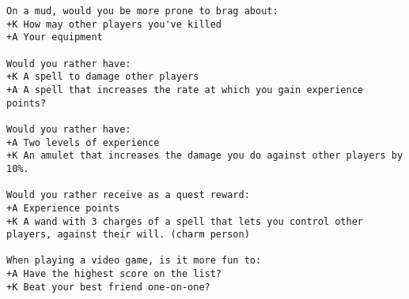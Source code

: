 \begin{verbatim}
On a mud, would you be more prone to brag about:
+K How may other players you've killed
+A Your equipment

Would you rather have:
+K A spell to damage other players
+A A spell that increases the rate at which you gain experience points?

Would you rather have:
+A Two levels of experience
+K An amulet that increases the damage you do against other players by 10%.

Would you rather receive as a quest reward:
+A Experience points
+K A wand with 3 charges of a spell that lets you control other players, against their will. (charm person)

When playing a video game, is it more fun to:
+A Have the highest score on the list?
+K Beat your best friend one-on-one?
\end{verbatim}
